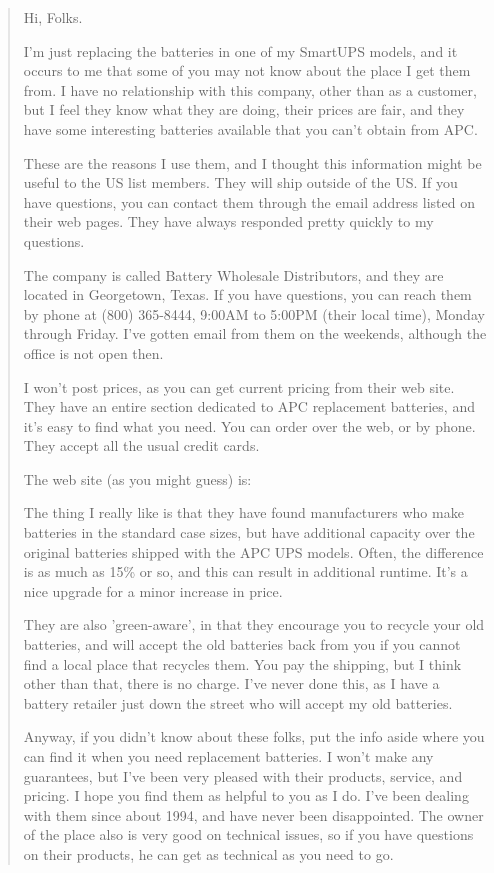 \begin{quote}

Hi, Folks.  

I'm just replacing the batteries in one of my SmartUPS models, and it occurs
to me that some of you may not know about the place I get them from. I have no
relationship with this company, other than as a customer, but I feel they know
what they are doing, their prices are fair, and they have some interesting
batteries available that you can't obtain from APC.  

These are the reasons I use them, and I thought this information might be
useful to the US list members. They will ship outside of the US. If you have
questions, you can contact them through the email address listed on their web
pages. They have always responded pretty quickly to my questions.  

The company is called Battery Wholesale Distributors, and they are located in
Georgetown, Texas. If you have questions, you can reach them by phone at (800)
365-8444, 9:00AM to 5:00PM (their local time), Monday through Friday. I've
gotten email from them on the weekends, although the office is not open then. 


I won't post prices, as you can get current pricing from their web site. They
have an entire section dedicated to APC replacement batteries, and it's easy
to find what you need. You can order over the web, or by phone. They accept
all the usual credit cards.  

The web site (as you might guess) is: 

The thing I really like is that they have found manufacturers who make
batteries in the standard case sizes, but have additional capacity over the
original batteries shipped with the APC UPS models. Often, the difference is
as much as 15\% or so, and this can result in additional runtime. It's a nice
upgrade for a minor increase in price.  

They are also 'green-aware', in that they encourage you to recycle your old
batteries, and will accept the old batteries back from you if you cannot find
a local place that recycles them. You pay the shipping, but I think other than
that, there is no charge. I've never done this, as I have a battery retailer
just down the street who will accept my old batteries.  

Anyway, if you didn't know about these folks, put the info aside where you can
find it when you need replacement batteries. I won't make any guarantees, but
I've been very pleased with their products, service, and pricing. I hope you
find them as helpful to you as I do. I've been dealing with them since about
1994, and have never been disappointed. The owner of the place also is very
good on technical issues, so if you have questions on their products, he can
get as technical as you need to go.  


\end{quote}
